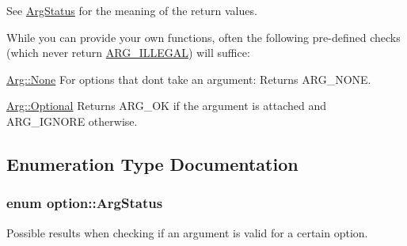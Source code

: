 See \hyperlink{namespaceoption_aee8c76a07877335762631491e7a5a1a9}{Arg\+Status} for the meaning of the return values.

While you can provide your own functions, often the following pre-\/defined checks (which never return \hyperlink{namespaceoption_aee8c76a07877335762631491e7a5a1a9a9528e32563b795bd2930b12d0a5e382d}{A\+R\+G\+\_\+\+I\+L\+L\+E\+G\+AL}) will suffice\+:

\begin{DoxyItemize}
\item {\ttfamily \hyperlink{structoption_1_1Arg_a7fc01987899c91c6b6a1be5711a46e22}{Arg\+::\+None}} For options that don\textquotesingle{}t take an argument\+: Returns A\+R\+G\+\_\+\+N\+O\+NE. \item {\ttfamily \hyperlink{structoption_1_1Arg_aadb5316ecbc9eb0a7f0019d14bf35ad0}{Arg\+::\+Optional}} Returns A\+R\+G\+\_\+\+OK if the argument is attached and A\+R\+G\+\_\+\+I\+G\+N\+O\+RE otherwise. \end{DoxyItemize}


\subsection{Enumeration Type Documentation}
\subsubsection[{\texorpdfstring{Arg\+Status}{ArgStatus}}]{\setlength{\rightskip}{0pt plus 5cm}enum {\bf option\+::\+Arg\+Status}}\hypertarget{namespaceoption_aee8c76a07877335762631491e7a5a1a9}{}\label{namespaceoption_aee8c76a07877335762631491e7a5a1a9}


Possible results when checking if an argument is valid for a certain option. 

